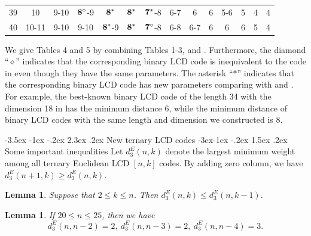 \documentclass[12pt,twoside]{article}
\makeatletter
\renewcommand\section{\@startsection {section}{1}{\z@}%
                                   {-3.5ex \@plus -1ex \@minus -.2ex}%
                                   {2.3ex \@plus.2ex}%
                                   {\normalfont\large\bfseries}}
\renewcommand\subsection{\@startsection{subsection}{2}{\z@}%
                                     {-3ex\@plus -1ex \@minus -.2ex}%
                                     {1.5ex \@plus .2ex}%
                                     {\normalfont\normalsize\bfseries}}
\theoremstyle{plain}
\newtheorem{lem}[theorem]{Lemma}
\theoremstyle{definition}
\theoremstyle{remark}
\makeatother
\begin{document}
{\begin{center}
\begin{threeparttable}
\begin{tabular}{cccccccccccccc}
39   & 10&  9-10& ${\bf8^\diamond}$-9& ${\bf 8^*}$& ${\bf8^*}$& ${\bf7^*}$-8 &   6-7&  6&6&  5-6& 5&4 & 4\\

40   & 10-11& 9-10&  9-10& ${\bf 8^*}$-9&${\bf8^*}$ & ${\bf7^\diamond}$-8 &  6-8&  6-7 & 6 &  6& 6&5 & 4\\
\hline
\end{tabular}
\begin{tablenotes}
\footnotesize
\item [4-5] {\small We give Tables 4 and 5
 by combining Tables 1-3, \cite[Tables 1-3]{2-LCD-40} and \cite[Tables 1-2]{B-LCD-40}.
Furthermore, the diamond ``$\diamond$'' indicates that the corresponding binary LCD code is
inequivalent to the code in \cite{2-LCD-40} even though they have the same parameters.
The asterisk ``$*$'' indicates that the corresponding binary LCD code has new parameters comparing with \cite{B-LCD-40} and \cite{2-LCD-40}.
For example, the best-known binary LCD code of the length 34 with the dimension 18 in \cite{2-LCD-40} has the minimum distance 6,
while the minimum distance of binary LCD codes with the same length and dimension we constructed is 8.}
\end{tablenotes}
\end{threeparttable}
\end{center}

}












\section{New ternary LCD codes}
\subsection{Some important inequalities}
Let $d^E_3(n,k)$ denote the largest minimum weight among all ternary Euclidean LCD $[n, k]$ codes. By adding zero column, we have $d^E_3 (n+1, k)\geq d^E_3 (n, k)$.

\begin{lem}{\rm\cite{34-LCD}}\label{lemma-leq-ternary}
Suppose that $2\leq k\leq n$. Then
$d^E_3(n,k)\leq d^E_3(n,k-1).$
\end{lem}

\begin{lem}{\rm\cite{ter-11-19}}
If $20\leq n\leq 25$, then we have
$$d_3^E(n,n-2)=2,\ d_3^E(n,n-3)=2,\ d_3^E(n,n-4)=3.$$
\end{lem}
\end{document}
